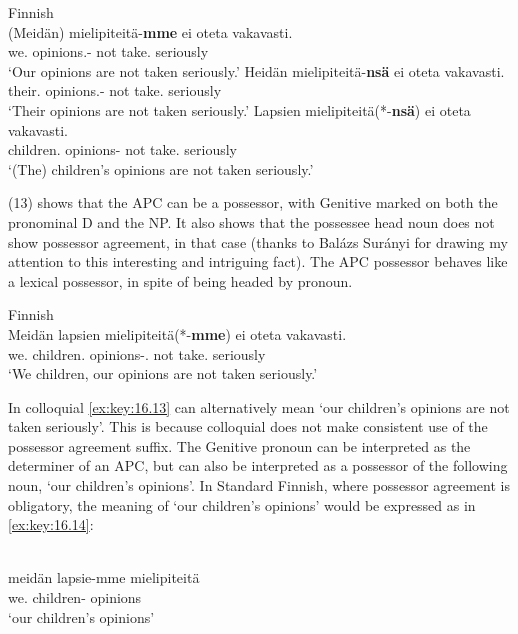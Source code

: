 \documentclass[output=paper]{langsci/langscibook}
\begin{document}
\ea Finnish\\\label{ex:key:16.12}
	\ea
		\gll (Meidän) mielipiteitä-\textbf{mme} ei   oteta   vakavasti.\\
        \hphantom{(}we.\Gen{} opinions.\Part{}-\Fpl{} not take.\Pass{} seriously\\
		\glt    `Our opinions are not taken seriously.'
	\ex
		\gll Heidän      mielipiteitä-\textbf{nsä} ei oteta  vakavasti.\\
			their.\Gen{} opinions.\Part{}-\Third{} not take.\Pass{} seriously\\
		\glt    `Their opinions are not taken seriously.'
	\ex
		\gll Lapsien mielipiteitä(*-\textbf{nsä})  ei  oteta           vakavasti.\\
			children.\Gen{} opinions-\Third{} not take.\Pass{} seriously\\
		\glt    `(The) children’s opinions are not taken seriously.'
	\z
\z

(13) shows that the \gls{APC} can be a possessor, with Genitive marked on both
the pronominal D and the NP. It also shows that the possessee head noun does
not show possessor agreement, in that case (thanks to Balázs Surányi for
drawing my attention to this interesting and intriguing fact). The \gls{APC}
possessor behaves like a lexical possessor, in spite of being headed by
pronoun.

\ea Finnish\label{ex:key:16.13}\\
	\gll Meidän  lapsien   mielipiteitä(*-\textbf{mme}) ei  oteta         vakavasti.\\
		we.\Gen{} children.\Gen{} opinions-\Part.\Fpl{} not take.\Pass{} seriously\\
	\glt    `We children, our opinions are not taken seriously.'
\z

In colloquial  \eqref{ex:key:16.13} can alternatively mean ‘our children’s opinions are
not taken seriously’. This is because colloquial  does not make
consistent use of the possessor agreement suffix. The Genitive pronoun can be
interpreted as the determiner of an \gls{APC}, but can also be interpreted as a
possessor of the following noun, ‘our children’s opinions’. In Standard
Finnish, where possessor agreement is obligatory, the meaning of ‘our
children’s opinions’ would be expressed as in \eqref{ex:key:16.14}:

\ea
    \label{ex:key:16.14} \\
    \gll meidän   lapsie-mme mielipiteitä \\
        we.\Gen{} children-\Fpl{} opinions\\
    \glt    `our children’s opinions'
\z
\end{document}
